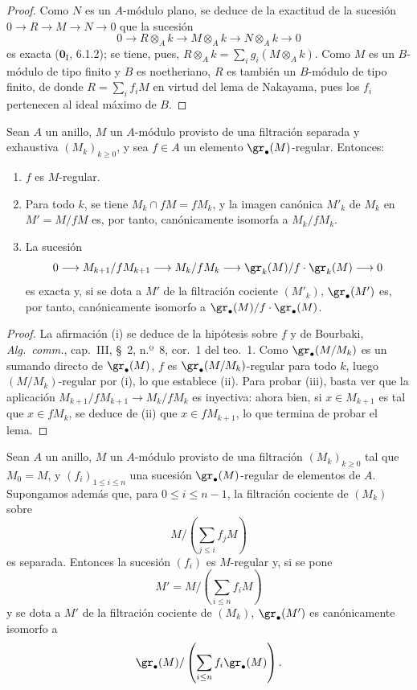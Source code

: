 \begin{proof}
Como $N$ es un $A$-módulo plano, se deduce de la exactitud de la sucesión
$0\to R\to M\to N\to0$ que la sucesión
\[
  0\longrightarrow R\otimes_A k\longrightarrow M\otimes_A k
  \longrightarrow N\otimes_A k\longrightarrow0
\]
es exacta ($\mathbf{0}_{\mathrm I}$, 6.1.2); se tiene, pues,
$R\otimes_A k=\sum_i g_i(M\otimes_A k)$. Como $M$ es un $B$-módulo de tipo
finito y $B$ es noetheriano, $R$ es también un $B$-módulo de tipo finito, de
donde $R=\sum_i f_iM$ en virtud del lema de Nakayama, pues los $f_i$ pertenecen
al ideal máximo de $B$.
\end{proof}

\begin{lemma}[15.1.18]
\label{0.15.1.18-es}
Sean $A$ un anillo, $M$ un $A$-módulo provisto de una filtración separada y
exhaustiva $(M_k)_{k\geq0}$, y sea $f\in A$ un elemento
$\gr_\bullet(M)$-regular. Entonces:
\begin{enumerate}
  \item[\textup{(i)}] $f$ es $M$-regular.
  \item[\textup{(ii)}] Para todo $k$, se tiene $M_k\cap fM=fM_k$, y la imagen canónica
  $M'_k$ de $M_k$ en $M'=M/fM$ es, por tanto, canónicamente isomorfa a
  $M_k/fM_k$.
  \item[\textup{(iii)}] La sucesión
  \[
    0\longrightarrow M_{k+1}/fM_{k+1}\longrightarrow M_k/fM_k
    \longrightarrow\gr_k(M)/f\cdot\gr_k(M)\longrightarrow0
  \]
  es exacta y, si se dota a $M'$ de la filtración cociente $(M'_k)$,
  $\gr_\bullet(M')$ es, por tanto, canónicamente isomorfo a
  $\gr_\bullet(M)/f\cdot\gr_\bullet(M)$.
\end{enumerate}
\end{lemma}

\begin{proof}
La afirmación (i) se deduce de la hipótesis sobre $f$ y de Bourbaki,
\emph{Alg.~comm.}, cap.~III, \S~2, n.º~8, cor.~1 del teo.~1. Como
$\gr_\bullet(M/M_k)$ es un sumando directo de $\gr_\bullet(M)$, $f$ es
$\gr_\bullet(M/M_k)$-regular para todo $k$, luego $(M/M_k)$-regular por (i),
lo que establece (ii). Para probar (iii), basta ver que la aplicación
$M_{k+1}/fM_{k+1}\to M_k/fM_k$ es inyectiva: ahora bien, si
$x\in M_{k+1}$ es tal que $x\in fM_k$, se deduce de (ii) que
$x\in fM_{k+1}$, lo que termina de probar el lema.
\end{proof}

\begin{proposition}[15.1.19]
\label{0.15.1.19-es}
Sean $A$ un anillo, $M$ un $A$-módulo provisto de una filtración
$(M_k)_{k\geq0}$ tal que $M_0=M$, y $(f_i)_{1\leq i\leq n}$ una sucesión
$\gr_\bullet(M)$-regular de elementos de $A$. Supongamos además que, para
$0\leq i\leq n-1$, la filtración cociente de $(M_k)$ sobre
\[
  M/\left(\sum_{j\leq i}f_jM\right)
\]
es separada. Entonces la sucesión $(f_i)$ es $M$-regular y, si se pone
\[
  M'=M/\left(\sum_{i\leq n}f_iM\right)
\]
y se dota a $M'$ de la filtración cociente de $(M_k)$,
$\gr_\bullet(M')$ es canónicamente isomorfo a
\[
  \gr_\bullet(M)/
  \left(\sum_{i\leq n}f_i\gr_\bullet(M)\right).
\]
\end{proposition}

